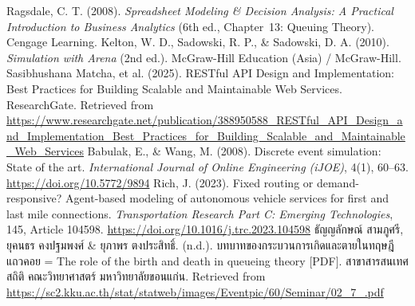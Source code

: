\begin{thebibliography}{99}
     Ragsdale, C. T. (2008). 
        \textit{Spreadsheet Modeling \& Decision Analysis: A Practical Introduction to Business Analytics} 
        (6th ed., Chapter~13: Queuing Theory). Cengage Learning.
     Kelton, W. D., Sadowski, R. P., \& Sadowski, D. A. (2010). 
        \textit{Simulation with Arena} (2nd ed.). McGraw-Hill Education (Asia) / McGraw-Hill.
	 Sasibhushana Matcha, et al. (2025). 
    RESTful API Design and Implementation: Best Practices for Building Scalable and Maintainable Web Services. 
    ResearchGate. Retrieved from \url{https://www.researchgate.net/publication/388950588_RESTful_API_Design_and_Implementation_Best_Practices_for_Building_Scalable_and_Maintainable_Web_Services}
	 Babulak, E., \& Wang, M. (2008). Discrete event simulation: State of the art. \textit{International Journal of Online Engineering (iJOE)}, 4(1), 60–63. \url{https://doi.org/10.5772/9894}
     Rich, J. (2023). Fixed routing or demand-responsive? Agent-based modeling of autonomous vehicle services for first and last mile connections. \textit{Transportation Research Part C: Emerging Technologies}, 145, Article 104598. \url{https://doi.org/10.1016/j.trc.2023.104598}
     ธัญญลักษณ์ สามภูศรี, ยุคนธร คงปฐมพงศ์ \& ยุภาพร ตงประสิทธิ์. (n.d.). บทบาทของกระบวนการเกิดและตายในทฤษฎีแถวคอย = The role of the birth and death in queueing theory [PDF]. สาขาสารสนเทศสถิติ คณะวิทยาศาสตร์ มหาวิทยาลัยขอนแก่น. Retrieved from \url{https://sc2.kku.ac.th/stat/statweb/images/Eventpic/60/Seminar/02_7_.pdf}
\end{thebibliography}

% 